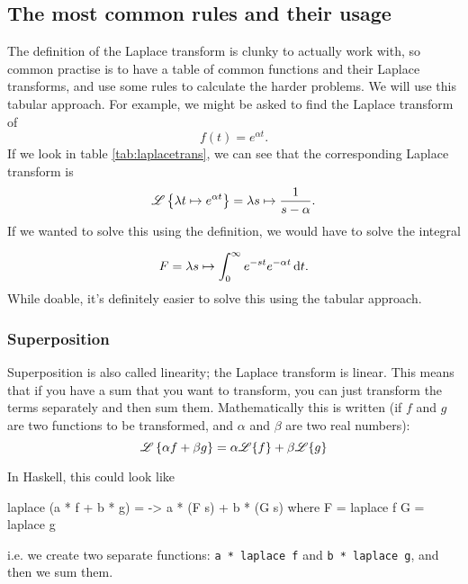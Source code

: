 \subsection{The most common rules and their usage} 

The definition of the Laplace transform is clunky to actually work with, so common practise is to have a table of common functions and their Laplace transforms, and use some rules to calculate the harder problems. 
We will use this tabular approach. For example, we might be asked to find the Laplace transform of 
\begin{equation*}
    f(t) = e^{\alpha t}.
\end{equation*}
If we look in table \ref{tab:laplacetrans}, we can see that the corresponding Laplace transform is 
\begin{equation*}
    \mathscr{L} \left\{\lambda t \mapsto e^{\alpha t}\right\} = \lambda s \mapsto \frac{1}{s-\alpha}.
\end{equation*}
If we wanted to solve this using the definition, we would have to solve the integral 

\begin{equation*}
    F = \lambda s \mapsto \int_0^\infty e^{-st} e^{-\alpha t} \, \dd t.
\end{equation*}
While doable, it's definitely easier to solve this using the tabular approach. 


\subsubsection{Superposition} 
Superposition is also called linearity; the Laplace transform is linear. This means that if you have a sum that you want to transform, you can just transform the terms separately and then sum them. Mathematically this is written (if $f$ and $g$ are two functions to be transformed, and $\alpha$ and $\beta$ are two real numbers):
\begin{equation*}
    \mathscr{L} \left\{\alpha f + \beta g\right\} = \alpha \mathscr{L}\{f\} + \beta \mathscr{L} \{g\} 
\end{equation*}

In Haskell, this could look like

\begin{codeeq} 
laplace (a * f + b * g) = \s -> a * (F s) + b * (G s)
                where F = laplace f
                      G = laplace g
\end{codeeq} 
i.e. we create two separate functions: \verb|a * laplace f| and \verb|b * laplace g|, and then we sum them. 


